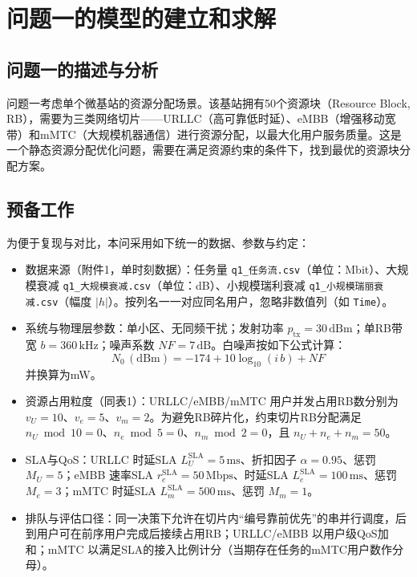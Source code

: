 \section{问题一的模型的建立和求解}
\subsection{问题一的描述与分析}

问题一考虑单个微基站的资源分配场景。该基站拥有50个资源块（Resource Block, RB），需要为三类网络切片——URLLC（高可靠低时延）、eMBB（增强移动宽带）和mMTC（大规模机器通信）进行资源分配，以最大化用户服务质量。这是一个静态资源分配优化问题，需要在满足资源约束的条件下，找到最优的资源块分配方案。

\subsection{预备工作}
为便于复现与对比，本问采用如下统一的数据、参数与约定：

\begin{itemize}
  \item 数据来源（附件1，单时刻数据）：任务量 \texttt{q1\_任务流.csv}（单位：Mbit）、大规模衰减 \texttt{q1\_大规模衰减.csv}（单位：dB）、小规模瑞利衰减 \texttt{q1\_小规模瑞丽衰减.csv}（幅度 $|h|$）。按列名一一对应同名用户，忽略非数值列（如 \texttt{Time}）。
  \item 系统与物理层参数：单小区、无同频干扰；发射功率 $p_{\mathrm{tx}}=30\,\mathrm{dBm}$；单RB带宽 $b=360\,\mathrm{kHz}$；噪声系数 $NF=7\,\mathrm{dB}$。白噪声按如下公式计算：
  \begin{equation}
    N_0\,(\mathrm{dBm}) = -174 + 10\log_{10}(i\,b) + NF
  \end{equation}
  并换算为mW。
  \item 资源占用粒度（同表1）：URLLC/eMBB/mMTC 用户并发占用RB数分别为 $v_U=10$、$v_e=5$、$v_m=2$。为避免RB碎片化，约束切片RB分配满足 $n_U\bmod 10=0$、$n_e\bmod 5=0$、$n_m\bmod 2=0$，且 $n_U+n_e+n_m=50$。
  \item SLA与QoS：URLLC 时延SLA $L_U^{\mathrm{SLA}}=5\,\mathrm{ms}$、折扣因子 $\alpha=0.95$、惩罚 $M_U=5$；eMBB 速率SLA $r_e^{\mathrm{SLA}}=50\,\mathrm{Mbps}$、时延SLA $L_e^{\mathrm{SLA}}=100\,\mathrm{ms}$、惩罚 $M_e=3$；mMTC 时延SLA $L_m^{\mathrm{SLA}}=500\,\mathrm{ms}$、惩罚 $M_m=1$。
  \item 排队与评估口径：同一决策下允许在切片内“编号靠前优先”的串并行调度，后到用户可在前序用户完成后接续占用RB；URLLC/eMBB 以用户级QoS加和；mMTC 以满足SLA的接入比例计分（当期存在任务的mMTC用户数作分母）。
\end{itemize}
